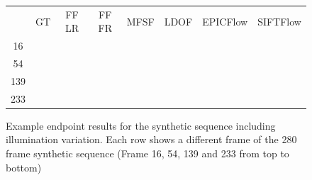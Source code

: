 \begin{landscape}
\thispagestyle{footeronly}
\newcommand{\framerowsynth}[1]{%
\adjustbox{valign=m,vspace=1pt}{\texttt{[image: face\_flow/images/synthetic/\#1\_gt]}}                &
\adjustbox{valign=m,vspace=1pt}{\texttt{[image: face\_flow/images/synthetic/\#1\_ff\_dsift\_sequence]}} &
\adjustbox{valign=m,vspace=1pt}{\texttt{[image: face\_flow/images/synthetic/\#1\_ff\_dsift\_single]}}   &
\adjustbox{valign=m,vspace=1pt}{\texttt{[image: face\_flow/images/synthetic/\#1\_mfsf]}}              &
\adjustbox{valign=m,vspace=1pt}{\texttt{[image: face\_flow/images/synthetic/\#1\_ldof]}}              &
\adjustbox{valign=m,vspace=1pt}{\texttt{[image: face\_flow/images/synthetic/\#1\_epicflow]}}          &
\adjustbox{valign=m,vspace=1pt}{\texttt{[image: face\_flow/images/synthetic/\#1\_siftflow]}}
}
\setlength{\tabcolsep}{1pt}
\begin{figure}[t]
    \centering
    \begin{tabular}{cccccccc}
        & GT & FF LR & FF FR & MFSF & LDOF & EPICFlow & SIFTFlow \\ \vspace{-0.3cm}
        16 & \framerowsynth{16}                                  \\ \vspace{-0.3cm}
        54 & \framerowsynth{54}                                  \\ \vspace{-0.3cm}
        139 & \framerowsynth{139}                                \\
        233 & \framerowsynth{233}
    \end{tabular}
    \caption{Example endpoint results for the synthetic sequence including
             illumination variation. Each row shows a different frame of the
             280 frame synthetic sequence (Frame 16, 54, 139 and 233 from top
             to bottom)}
\label{fig:synthetic_examples}
\end{figure}
\setlength{\tabcolsep}{6pt}
\end{landscape}
